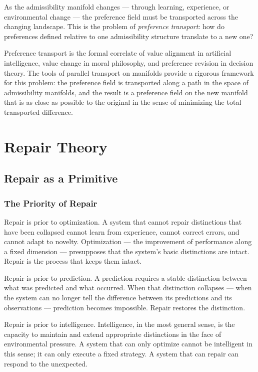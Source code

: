 \documentclass[12pt,a4paper]{book}
\theoremstyle{remark}
\theoremstyle{definition}
\begin{document}
As the admissibility manifold changes --- through learning, experience,
or environmental change --- the preference field must be transported
across the changing landscape. This is the problem of \emph{preference
transport}: how do preferences defined relative to one admissibility
structure translate to a new one?

Preference transport is the formal correlate of value alignment in
artificial intelligence, value change in moral philosophy, and preference
revision in decision theory. The tools of parallel transport on manifolds
provide a rigorous framework for this problem: the preference field is
transported along a path in the space of admissibility manifolds, and
the result is a preference field on the new manifold that is as close as
possible to the original in the sense of minimizing the total transported
difference.

\part{Repair Theory}

\chapter{Repair as a Primitive}

\section{The Priority of Repair}

Repair is prior to optimization. A system that cannot repair distinctions
that have been collapsed cannot learn from experience, cannot correct
errors, and cannot adapt to novelty. Optimization --- the improvement of
performance along a fixed dimension --- presupposes that the system's
basic distinctions are intact. Repair is the process that keeps them
intact.

Repair is prior to prediction. A prediction requires a stable distinction
between what was predicted and what occurred. When that distinction
collapses --- when the system can no longer tell the difference between
its predictions and its observations --- prediction becomes impossible.
Repair restores the distinction.

Repair is prior to intelligence. Intelligence, in the most general sense,
is the capacity to maintain and extend appropriate distinctions in the
face of environmental pressure. A system that can only optimize cannot
be intelligent in this sense; it can only execute a fixed strategy. A
system that can repair can respond to the unexpected.
\end{document}
